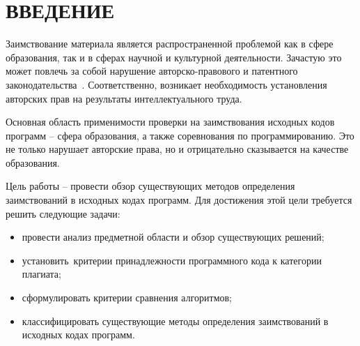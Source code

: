 \section*{ВВЕДЕНИЕ}

Заимствование материала является распространенной проблемой как в сфере образования, так и в сферах научной и культурной деятельности. Зачастую это может повлечь за собой нарушение авторско-правового и патентного законодательства~\cite{law}. Соответственно, возникает необходимость установления авторских прав на результаты интеллектуального труда.

Основная область применимости проверки на заимствования исходных кодов программ -- сфера образования, а также соревнования по программированию. Это не только нарушает авторские права, но и отрицательно сказывается на качестве образования.

Цель работы -- провести обзор существующих методов определения заимствований в исходных кодах программ.
Для достижения этой цели требуется решить следующие задачи:
\begin{itemize}[label*=---]
	\item провести анализ предметной области и обзор существующих решений;
	\item установить критерии принадлежности программного кода к категории плагиата;
	\item сформулировать критерии сравнения алгоритмов;
	\item классифицировать существующие методы определения заимствований в исходных кодах программ.
\end{itemize}

\pagebreak